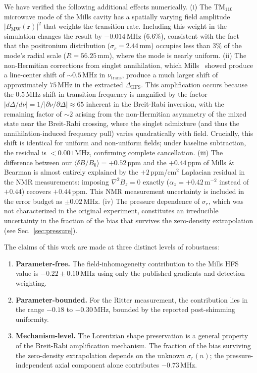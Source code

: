 \documentclass[twocolumn,pra,aps,superscriptaddress,floatfix,10pt]{revtex4-2}
\begin{document}
We have verified the following additional effects numerically. (i) The TM$_{110}$ microwave mode of the Mills cavity has a spatially varying field amplitude $|B_\mathrm{MW}(\mathbf{r})|^2$ that weights the transition rate. Including this weight in the simulation changes the result by $-0.014$\,MHz ($6.6\%$), consistent with the fact that the positronium distribution ($\sigma_r = 2.44$\,mm) occupies less than $3\%$ of the mode's radial scale ($R = 56.25$\,mm), where the mode is nearly uniform. (ii) The non-Hermitian corrections from singlet annihilation, which Mills~\cite{Mills1983} showed produce a line-center shift of $\sim 0.5$\,MHz in $\nu_\mathrm{trans}$, produce a much larger shift of approximately $75$\,MHz in the extracted $\Delta_\mathrm{HFS}$. This amplification occurs because the $0.5$\,MHz shift in transition frequency is magnified by the factor $|d\Delta/d\nu| = 1/|\partial\nu/\partial\Delta| \approx 65$ inherent in the Breit-Rabi inversion, with the remaining factor of $\sim 2$ arising from the non-Hermitian asymmetry of the mixed state near the Breit-Rabi crossing, where the singlet admixture (and thus the annihilation-induced frequency pull) varies quadratically with field. Crucially, this shift is identical for uniform and non-uniform fields; under baseline subtraction, the residual is $< 0.001$\,MHz, confirming complete cancellation. (iii) The difference between our $\langle\delta B/B_0\rangle = +0.52$\,ppm and the $+0.44$\,ppm of Mills \& Bearman is almost entirely explained by the $+2$\,ppm/cm$^2$ Laplacian residual in the NMR measurements: imposing $\nabla^2 B_z = 0$ exactly ($\alpha_z = +0.42$\,m$^{-2}$ instead of $+0.44$) recovers $+0.44$\,ppm. This NMR measurement uncertainty is included in the error budget as $\pm 0.02$\,MHz. (iv) The pressure dependence of $\sigma_r$, which was not characterized in the original experiment, constitutes an irreducible uncertainty in the fraction of the bias that survives the zero-density extrapolation (see Sec.~\ref{sec:pressure}).

The claims of this work are made at three distinct levels of robustness:
\begin{enumerate}
  \item \textbf{Parameter-free.} The field-inhomogeneity contribution to the Mills HFS value is $-0.22 \pm 0.10$\,MHz using only the published gradients and detection weighting.
  \item \textbf{Parameter-bounded.} For the Ritter measurement, the contribution lies in the range $-0.18$ to $-0.30$\,MHz, bounded by the reported post-shimming uniformity.
  \item \textbf{Mechanism-level.} The Lorentzian shape preservation is a general property of the Breit-Rabi amplification mechanism. The fraction of the bias surviving the zero-density extrapolation depends on the unknown $\sigma_r(n)$; the pressure-independent axial component alone contributes $-0.73$\,MHz.
\end{enumerate}
\end{document}
